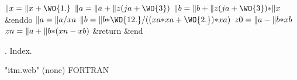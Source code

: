 ${}\|x=\|x+\WO{1.}$\6
${}\|a=\|a+\|z(\\{ja}+\WO{3})$\6
${}\|b=\|b+\|z(\\{ja}+\WO{3})\ast\|x$\2\6
\&{enddo}\6
${}\|a=\|a/\\{xa}$\6
${}\|b=\|b\ast\WO{12.}/((\\{xa}\ast\\{xa}+\WO{2.})\ast\\{xa})$\6
${}\\{z0}=\|a-\|b\ast\\{xb}$\6
${}\\{zn}=\|a+\|b\ast(\\{xn}-\\{xb})$\6
\&{return}\2\6
\&{end}\WY\par
\fi %

.  Index.
\fi %




  {"itm.web"} {(none)}
 {FORTRAN}

\Wcon
